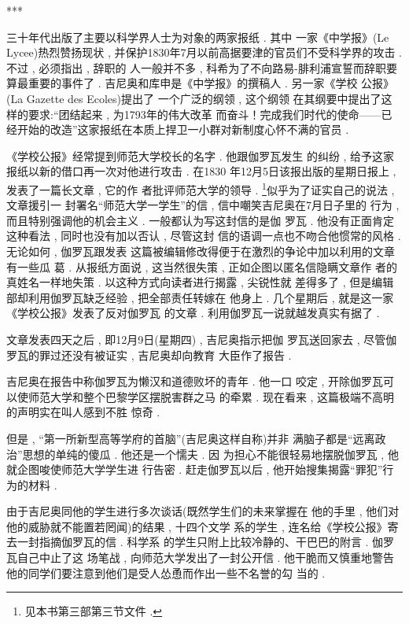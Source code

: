 \begin{center}***
\end{center}

三十年代出版了主要以科学界人士为对象的两家报纸 . 其中 一家《中学报》(Le Lycee)热烈赞扬现状 , 并保护1830年7月以前高据要津的官员们不受科学界的攻击 . 不过 , 必须指出 , 辞职的 人一般并不多 , 科希为了不向路易-腓利浦宣誓而辞职要算最重要的事件了 . 吉尼奥和库申是《中学报》的撰稿人 . 另一家《学校 公报》(La Gazette des Ecoles)提出了 一个广泛的纲领 , 这个纲领 在其纲要中提出了这样的要求:“团结起来 , 为1793年的伟大改革 而奋斗！完成我们时代的使命——已经开始的改造”这家报纸在本质上捍卫一小群对新制度心怀不满的官员 . 

《学校公报》经常提到师范大学校长的名字 . 他跟伽罗瓦发生 的纠纷 , 给予这家报纸以新的借口再一次对他进行攻击 . 在1830 年12月5日该报出版的星期日报上 , 发表了一篇长文章 , 它的作 者批评师范大学的领导 . \footnote{见本书第三部第三节文件 . }似乎为了证实自己的说法 , 文章援引一 封署名“师范大学一学生”的信 , 信中嘲笑吉尼奥在7月日子里的 行为 , 而且特别强调他的机会主义 . 一般都认为写这封信的是伽 罗瓦 . 他没有正面肯定这种看法 , 同时也没有加以否认 , 尽管这封 信的语调一点也不吻合他惯常的风格 . 无论如何 , 伽罗瓦跟发表 这篇被编辑修改得便于在激烈的争论中加以利用的文章有一些瓜 葛 . 从报纸方面说 , 这当然很失策 , 正如企图以匿名信隐瞒文章作 者的真姓名一样地失策 . 以这种方式向读者进行揭露 , 尖锐性就 差得多了 , 但是编辑部却利用伽罗瓦缺乏经验 , 把全部责任转嫁在 他身上 . 几个星期后 , 就是这一家《学校公报》发表了反对伽罗瓦 的文章 . 利用伽罗瓦一说就越发真实有据了 . 

文章发表四天之后 , 即12月9日(星期四) , 吉尼奥指示把伽 罗瓦送回家去 , 尽管伽罗瓦的罪过还没有被证实 , 吉尼奥却向教育 大臣作了报告 . 

吉尼奥在报告中称伽罗瓦为懒汉和道德败坏的青年 . 他一口 咬定 , 开除伽罗瓦可以使师范大学和整个巴黎学区摆脱害群之马 的牵累 . 现在看来 , 这篇极端不高明的声明实在叫人感到不胜 惊奇 . 

但是 , “第一所新型高等学府的首脑”(吉尼奥这样自称)并非 满脑子都是“远离政治”思想的单纯的傻瓜 . 他还是一个懦夫 . 因 为担心不能很轻易地摆脱伽罗瓦 , 他就企图唆使师范大学学生进 行告密 . 赶走伽罗瓦以后 , 他开始搜集揭露“罪犯”行为的材料 . 

由于吉尼奥同他的学生进行多次谈话(既然学生们的未来掌握在 他的手里 , 他们对他的威胁就不能置若罔闻)的结果 , 十四个文学 系的学生 , 连名给《学校公报》寄去一封指摘伽罗瓦的信 . 科学系 的学生只附上比较冷静的、干巴巴的附言 . 伽罗瓦自己中止了这 场笔战 , 向师范大学发出了一封公开信 . 他干脆而又慎重地警告 他的同学们要注意到他们是受人怂恿而作出一些不名誉的勾 当的 . 

